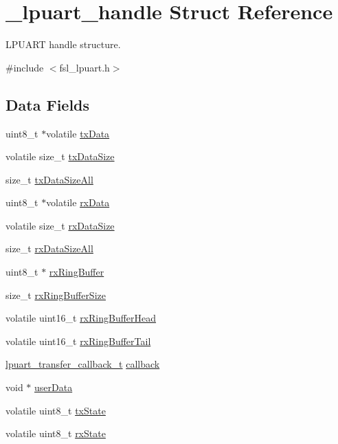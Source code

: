 \hypertarget{struct__lpuart__handle}{}\section{\+\_\+lpuart\+\_\+handle Struct Reference}
\label{struct__lpuart__handle}


L\+P\+U\+A\+RT handle structure.  




{\ttfamily \#include $<$fsl\+\_\+lpuart.\+h$>$}

\subsection*{Data Fields}
\begin{DoxyCompactItemize}
\item 
uint8\+\_\+t $\ast$volatile \mbox{\hyperlink{struct__lpuart__handle_ab56d8f300582ce9d7f4a79729124739d}{tx\+Data}}
\item 
volatile size\+\_\+t \mbox{\hyperlink{struct__lpuart__handle_a1f9d0ac47a5cdabb34988d5d811aceaf}{tx\+Data\+Size}}
\item 
size\+\_\+t \mbox{\hyperlink{struct__lpuart__handle_a733be3042be24bb3eb6f0c6a82d28862}{tx\+Data\+Size\+All}}
\item 
uint8\+\_\+t $\ast$volatile \mbox{\hyperlink{struct__lpuart__handle_aa58335de5bfa8923228432b62ea9308a}{rx\+Data}}
\item 
volatile size\+\_\+t \mbox{\hyperlink{struct__lpuart__handle_ae1b7c6ae1b7e7ead628afe5410fa3f31}{rx\+Data\+Size}}
\item 
size\+\_\+t \mbox{\hyperlink{struct__lpuart__handle_a180fd12c1a88bb61ac4b817f4e4e6bcd}{rx\+Data\+Size\+All}}
\item 
uint8\+\_\+t $\ast$ \mbox{\hyperlink{struct__lpuart__handle_a522d206ac2b0dde63cd3e7190853eaf2}{rx\+Ring\+Buffer}}
\item 
size\+\_\+t \mbox{\hyperlink{struct__lpuart__handle_a3fc25566538e662d74eb1444598a8277}{rx\+Ring\+Buffer\+Size}}
\item 
volatile uint16\+\_\+t \mbox{\hyperlink{struct__lpuart__handle_ac4f75206cf9b8009cdf64a30e05b01d8}{rx\+Ring\+Buffer\+Head}}
\item 
volatile uint16\+\_\+t \mbox{\hyperlink{struct__lpuart__handle_a89b3f14260503bd82300f27872236474}{rx\+Ring\+Buffer\+Tail}}
\item 
\mbox{\hyperlink{group__lpuart__driver_ga558e0c23c05831e446708a3935f36332}{lpuart\+\_\+transfer\+\_\+callback\+\_\+t}} \mbox{\hyperlink{struct__lpuart__handle_a7d5bcc8b0ccdc3f03f12eb8ac65352ad}{callback}}
\item 
void $\ast$ \mbox{\hyperlink{struct__lpuart__handle_a2e294dd14122c554baa0665072b4ca7a}{user\+Data}}
\item 
volatile uint8\+\_\+t \mbox{\hyperlink{struct__lpuart__handle_a4e027f3342bad321ec60b56d164eb068}{tx\+State}}
\item 
volatile uint8\+\_\+t \mbox{\hyperlink{struct__lpuart__handle_a6f289c8f3bd5e967fb808de6da7f1c0c}{rx\+State}}
\end{DoxyCompactItemize}


